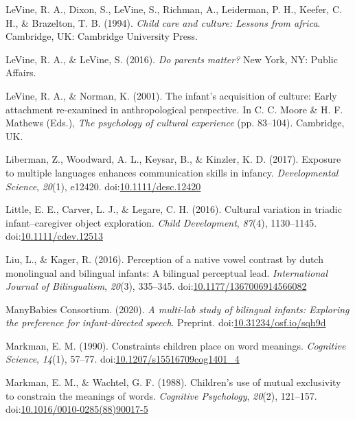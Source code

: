 \documentclass[,man,floatsintext]{apa6}
\begin{document}
\leavevmode\hypertarget{ref-LeVine_etal_1994}{}%
LeVine, R. A., Dixon, S., LeVine, S., Richman, A., Leiderman, P. H., Keefer, C. H., \& Brazelton, T. B. (1994). \emph{Child care and culture: Lessons from africa}. Cambridge, UK: Cambridge University Press.

\leavevmode\hypertarget{ref-LeVine_LeVine_2016}{}%
LeVine, R. A., \& LeVine, S. (2016). \emph{Do parents matter?} New York, NY: Public Affairs.

\leavevmode\hypertarget{ref-LeVine_Norman_2001}{}%
LeVine, R. A., \& Norman, K. (2001). The infant's acquisition of culture: Early attachment re-examined in anthropological perspective. In C. C. Moore \& H. F. Mathews (Eds.), \emph{The psychology of cultural experience} (pp. 83--104). Cambridge, UK.

\leavevmode\hypertarget{ref-Liberman_etal_2017}{}%
Liberman, Z., Woodward, A. L., Keysar, B., \& Kinzler, K. D. (2017). Exposure to multiple languages enhances communication skills in infancy. \emph{Developmental Science}, \emph{20}(1), e12420. doi:\href{https://doi.org/10.1111/desc.12420}{10.1111/desc.12420}

\leavevmode\hypertarget{ref-Little_etal_2016}{}%
Little, E. E., Carver, L. J., \& Legare, C. H. (2016). Cultural variation in triadic infant--caregiver object exploration. \emph{Child Development}, \emph{87}(4), 1130--1145. doi:\href{https://doi.org/10.1111/cdev.12513}{10.1111/cdev.12513}

\leavevmode\hypertarget{ref-Liu_Kager_2016}{}%
Liu, L., \& Kager, R. (2016). Perception of a native vowel contrast by dutch monolingual and bilingual infants: A bilingual perceptual lead. \emph{International Journal of Bilingualism}, \emph{20}(3), 335--345. doi:\href{https://doi.org/10.1177/1367006914566082}{10.1177/1367006914566082}

\leavevmode\hypertarget{ref-ManyBabiesConsortium_2020}{}%
ManyBabies Consortium. (2020). \emph{A multi-lab study of bilingual infants: Exploring the preference for infant-directed speech}. Preprint. doi:\href{https://doi.org/10.31234/osf.io/sqh9d}{10.31234/osf.io/sqh9d}

\leavevmode\hypertarget{ref-Markman_1990}{}%
Markman, E. M. (1990). Constraints children place on word meanings. \emph{Cognitive Science}, \emph{14}(1), 57--77. doi:\href{https://doi.org/10.1207/s15516709cog1401_4}{10.1207/s15516709cog1401\_4}

\leavevmode\hypertarget{ref-Markman_Wachtel_1988}{}%
Markman, E. M., \& Wachtel, G. F. (1988). Children's use of mutual exclusivity to constrain the meanings of words. \emph{Cognitive Psychology}, \emph{20}(2), 121--157. doi:\href{https://doi.org/10.1016/0010-0285(88)90017-5}{10.1016/0010-0285(88)90017-5}
\end{document}
